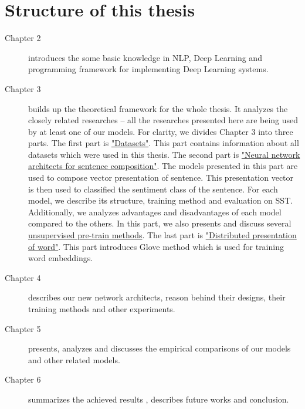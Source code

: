 \section{Structure of this thesis}
\begin{description}
\item [Chapter 2] introduces the some basic knowledge in NLP, Deep Learning and programming framework for implementing Deep Learning systems. 
\item [Chapter 3] builds up the theoretical framework for the whole thesis. 
It analyzes the closely related researches -- all the researches presented here are being used by at least one of our models.
For clarity, we divides Chapter 3 into three parts.
The first part is \hyperref[sec:dataset]{"Datasets"}. 
This part contains information about all datasets which were used in this thesis.
The second part is \hyperref[sec:composer]{"Neural network architects for sentence composition"}.
The models presented in this part are used to compose vector presentation of sentence.
This presentation vector is then used to classified the sentiment class of the sentence.
For each model, we describe its structure, training method and evaluation on SST.
Additionally, we analyzes advantages and disadvantages of each model compared to the others.
In this part, we also presents and discuss several \hyperref[sec:unsupervised-pretrain]{unsupervised pre-train methods}.
The last part is \hyperref[sec:distributed-word]{"Distributed presentation of word"}. 
This part introduces Glove method which is used for training word embeddings.
\item [Chapter 4] describes our new network architects, reason behind their designs, their training methods and other experiments. 
\item [Chapter 5] presents, analyzes and discusses the empirical comparisons of our models and other related models.
\item [Chapter 6] summarizes the achieved results , describes future works and conclusion.
\end{description}